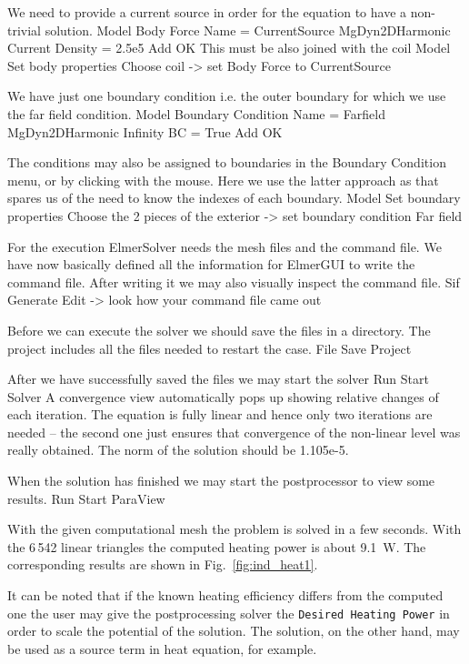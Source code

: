 We need to provide a current source in order for the equation to have a non-trivial solution.
\ttbegin
Model
  Body Force
    Name = CurrentSource
    MgDyn2DHarmonic
      Current Density = 2.5e5
    Add
    OK
\ttend   
This must be also joined with the coil
\ttbegin
Model
  Set body properties
    Choose coil -> set Body Force to CurrentSource
\ttend


We have just one boundary condition i.e. the outer boundary for which we use the far field condition.
\ttbegin
Model
  Boundary Condition
    Name = Farfield
    MgDyn2DHarmonic
      Infinity BC = True
    Add
    OK
\ttend   

The conditions may also be assigned to boundaries in the Boundary Condition menu, or
by clicking with the mouse. Here we use the latter approach as that spares us of the 
need to know the indexes of each boundary.
\ttbegin
Model
  Set boundary properties
    Choose the 2 pieces of the exterior -> set boundary condition Far field
\ttend

For the execution 
ElmerSolver needs the mesh files and the command file. We have now basically defined
all the information for ElmerGUI to write the command file. After writing it we may also visually 
inspect the command file.
\ttbegin
Sif 
  Generate
  Edit -> look how your command file came out  
\ttend

Before we can execute the solver we should save the files in a directory. The project includes
all the files needed to restart the case.
\ttbegin
File 
  Save Project
\ttend

After we have successfully saved the files we may start the solver
\ttbegin
Run
  Start Solver
\ttend
A convergence view automatically pops up showing relative changes of each iteration.
The equation is fully linear and hence only two iterations are needed -- the second 
one just ensures that convergence of the non-linear level was really obtained. 
The norm of the solution should be 1.105e-5.



When the solution has finished we may start the postprocessor to view some results.
\ttbegin
Run
  Start ParaView
\ttend


With the given computational mesh the problem is solved in 
a few seconds. With the 6\,542 linear triangles the computed heating
power is about 9.1~W. The corresponding results are shown
in Fig.~\ref{fig:ind_heat1}.

It can be noted that if the known heating efficiency differs from the computed one
the user may give the postprocessing solver the \texttt{Desired Heating Power} in order to scale 
the potential of the solution. The solution, on the other hand, may be used as a source term 
in heat equation, for example. 

